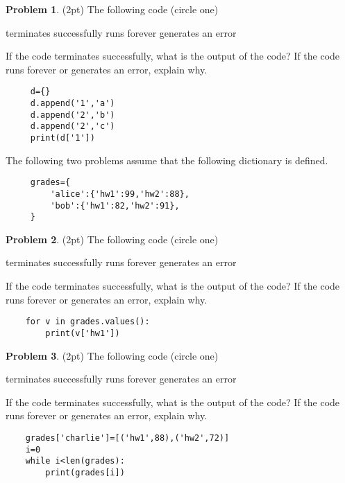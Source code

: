 \documentclass[10pt]{article}
\theoremstyle{definition}
\newtheorem{problem}{Problem}
\begin{document}
\begin{problem}
    (2pt)
    The following code (circle one)
    
    \vspace{0.25in}
    \hspace{0.5in}terminates successfully
    \hspace{1in}runs forever
    \hspace{1in}generates an error
    \vspace{0.25in}

    \noindent
    If the code terminates successfully, what is the output of the code?
    If the code runs forever or generates an error, explain why.
\end{problem}
\begin{lstlisting}
     d={}
     d.append('1','a')
     d.append('2','b')
     d.append('2','c')
     print(d['1'])
\end{lstlisting}
\vspace{2in}
\newpage
     \noindent
     The following two problems assume that the following dictionary is defined.
     \begin{lstlisting}
     grades={
         'alice':{'hw1':99,'hw2':88},
         'bob':{'hw1':82,'hw2':91},
     }
     \end{lstlisting}
\begin{problem}
    (2pt)
    The following code (circle one)
    
    \vspace{0.25in}
    \hspace{0.5in}terminates successfully
    \hspace{1in}runs forever
    \hspace{1in}generates an error
    \vspace{0.25in}

    \noindent
    If the code terminates successfully, what is the output of the code?
    If the code runs forever or generates an error, explain why.
\end{problem}
\begin{lstlisting}
    for v in grades.values():
        print(v['hw1'])
\end{lstlisting}
\vspace{2.5in}

\begin{problem}
    (2pt)
    The following code (circle one)
    
    \vspace{0.25in}
    \hspace{0.5in}terminates successfully
    \hspace{1in}runs forever
    \hspace{1in}generates an error
    \vspace{0.25in}

    \noindent
    If the code terminates successfully, what is the output of the code?
    If the code runs forever or generates an error, explain why.
\end{problem}
\begin{lstlisting}
    grades['charlie']=[('hw1',88),('hw2',72)]
    i=0
    while i<len(grades):
        print(grades[i])
\end{lstlisting}
\vspace{1.5in}
\end{document}
